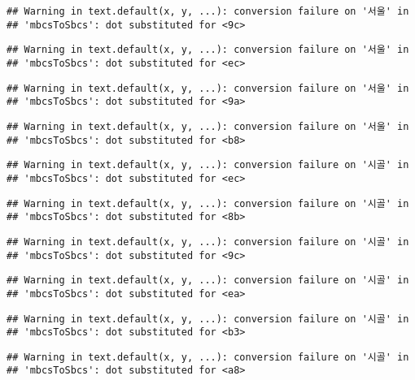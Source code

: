 \documentclass[
]{article}
\begin{document}
\begin{verbatim}
## Warning in text.default(x, y, ...): conversion failure on '서울' in
## 'mbcsToSbcs': dot substituted for <9c>
\end{verbatim}

\begin{verbatim}
## Warning in text.default(x, y, ...): conversion failure on '서울' in
## 'mbcsToSbcs': dot substituted for <ec>
\end{verbatim}

\begin{verbatim}
## Warning in text.default(x, y, ...): conversion failure on '서울' in
## 'mbcsToSbcs': dot substituted for <9a>
\end{verbatim}

\begin{verbatim}
## Warning in text.default(x, y, ...): conversion failure on '서울' in
## 'mbcsToSbcs': dot substituted for <b8>
\end{verbatim}

\begin{verbatim}
## Warning in text.default(x, y, ...): conversion failure on '시골' in
## 'mbcsToSbcs': dot substituted for <ec>
\end{verbatim}

\begin{verbatim}
## Warning in text.default(x, y, ...): conversion failure on '시골' in
## 'mbcsToSbcs': dot substituted for <8b>
\end{verbatim}

\begin{verbatim}
## Warning in text.default(x, y, ...): conversion failure on '시골' in
## 'mbcsToSbcs': dot substituted for <9c>
\end{verbatim}

\begin{verbatim}
## Warning in text.default(x, y, ...): conversion failure on '시골' in
## 'mbcsToSbcs': dot substituted for <ea>
\end{verbatim}

\begin{verbatim}
## Warning in text.default(x, y, ...): conversion failure on '시골' in
## 'mbcsToSbcs': dot substituted for <b3>
\end{verbatim}

\begin{verbatim}
## Warning in text.default(x, y, ...): conversion failure on '시골' in
## 'mbcsToSbcs': dot substituted for <a8>
\end{verbatim}
\end{document}

